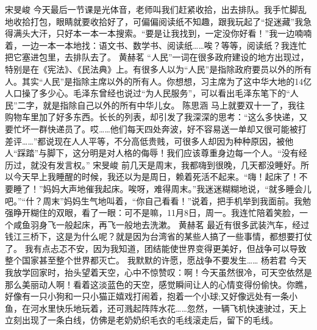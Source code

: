 {}\markdownRendererInterblockSeparator
{}宋旻峻\markdownRendererInterblockSeparator
{}今天最后一节课是光体音，老师叫我们赶紧收拾，出去排队。我手忙脚乱地收拾打包，眼睛就要收拾好了，可偏偏阅读纸不知趣，跟我玩起了“捉迷藏”我急得满头大汗，只好本一本一本搜索。“要是让我找到，一定没你好看！”我一边喃喃着，一边一本一本地找：语文书、数学书、阅读纸……唉？等等，阅读纸？我连忙把它塞进包里，去排队去了。 \markdownRendererInterblockSeparator
{}\markdownRendererInterblockSeparator
{}黄赫茗\markdownRendererInterblockSeparator
{}“人民”一词在很多政府建设的地方出现过，特别是在《宪法》、《民法典》上。有很多人以为“人民”是指除政府要员以外的所有人。其实“人民”是指除主席以外的所有人。你想想，习主席为了这中华大地的14亿人口操了多少心。毛泽东曾经也说过“为人民服务”，可以看出毛泽东笔下的“人民”二字，就是指除自己以外的所有中华儿女。\markdownRendererInterblockSeparator
{}\markdownRendererInterblockSeparator
{}陈思涵\markdownRendererInterblockSeparator
{}马上就要双十一了，我往购物车里加了好多东西。长长的列表，却引发了我深深的思考：“这么多快递，又要忙坏一群快递员了。哎……他们每天四处奔波，好不容易送一单却又很可能被打差评……”都说现在人人平等，不分高低贵贱，可很多人却因为种种原因，被他人“踩踏”与脚下，这分明是对人格的侮辱！我们应该尊重身边每一个人。“没有经历过，就没有发言权。”\markdownRendererInterblockSeparator
{}\markdownRendererInterblockSeparator
{}宋旻峻\markdownRendererInterblockSeparator
{}前几天是周末，我都嗨到很晚，几天都没睡好。所以今天早上我睡醒的时候，我还以为是周日，赖着死活不起来。“嗨！起床了！不要睡了！”妈妈大声地催我起床。唉呀，难得周末。”我迷迷糊糊地说，“就多睡会儿吧。”“什？周末”妈妈生气地叫着，“你自己看看！”说着，把手机举到我面前。我勉强睁开糊住的双眼，看了一眼：可不是嘛，11月8日，周一。我连忙陪着笑脸，一个咸鱼羽身飞一般起床，再飞一般地去洗漱。\markdownRendererInterblockSeparator
{}\markdownRendererInterblockSeparator
{}黄赫茗\markdownRendererInterblockSeparator
{}最近有很多武装汽车，经过钱江三桥下，这是为什么呢？就是因为台湾省的某些人搞了一些事情，都想要打仗了。\markdownRendererInterblockSeparator
{}我有点忐忑不安，因为我知道，团结能使世界变得更美好，但战争可以导致整个国家甚至整个世界都灭亡。\markdownRendererInterblockSeparator
{}我默默的许愿，愿战争不要发生……\markdownRendererInterblockSeparator
{}\markdownRendererInterblockSeparator
{}杨若君\markdownRendererInterblockSeparator
{}今天我放学回家时，抬头望着天空，心中不惊赞叹：啊！今天虽然很冷，可天空依然是那么美丽动人啊！看着这淡蓝色的天空，感觉瞬间让人的心情变得份偷快。你瞧，好像有一只小狗和一只小猫正嬉戏打闹着，抱着一个小球;又好像远处有一条小鱼，在河水里快乐地玩着，还可溅起阵阵水花……忽然，一辆飞机快速驶过，天上立刻出现了一条白线，仿佛是老奶奶织毛衣的毛线滚走后，留下的毛线。\markdownRendererInterblockSeparator
